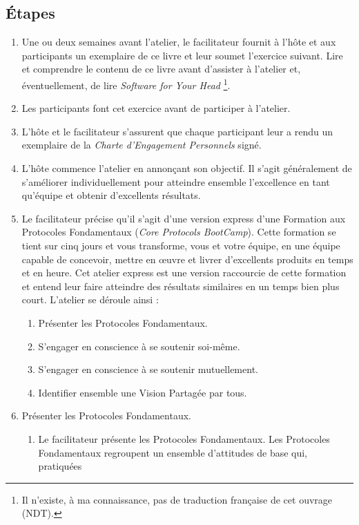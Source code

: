 \documentclass[paper=6in:9in,pagesize=pdftex,headinclude=on,footinclude=on,11pt]{scrbook}
\begin{document}
\subsection{Étapes}
\begin{enumerate}
	\item Une ou deux semaines avant l'atelier, le facilitateur fournit à l'hôte et aux participants un exemplaire de ce livre et leur soumet l'exercice suivant.
	      Lire et comprendre le contenu de ce livre avant d'assister à l'atelier et, éventuellement, de lire \emph{Software for Your Head}
	      \footnote{Il n'existe, à ma connaissance, pas de traduction française de cet ouvrage (NDT).}.
	\item Les participants font cet exercice avant de participer à l'atelier.
	\item L'hôte et le facilitateur s'assurent que chaque participant leur a rendu un exemplaire de la \emph{Charte d'Engagement Personnels} signé.
	\item L'hôte commence l'atelier en annonçant son objectif. Il s'agit généralement de s'améliorer individuellement pour atteindre ensemble l'excellence en tant
	      qu'équipe et obtenir d'excellents résultats.
	\item Le facilitateur précise qu'il s'agit d'une version \og{}express\fg{} d'une Formation aux Protocoles Fondamentaux (\emph{Core Protocols BootCamp}). Cette
	      formation se tient sur cinq jours et vous transforme, vous et votre équipe, en une équipe capable de concevoir, mettre en œuvre et livrer d'excellents
	      produits en temps et en heure. Cet atelier express est une version raccourcie de cette formation et entend leur faire atteindre des résultats similaires
	      en un temps bien plus court. L'atelier se déroule ainsi :
	      \begin{enumerate}
	      	\item Présenter les Protocoles Fondamentaux.
	      	\item S'engager en conscience à se soutenir soi-même.
	      	\item S'engager en conscience à se soutenir mutuellement.
	      	\item Identifier ensemble une Vision Partagée par tous.
	      \end{enumerate}
	\item Présenter les Protocoles Fondamentaux.
	      \begin{enumerate}
	      	\item Le facilitateur présente les Protocoles Fondamentaux. Les Protocoles Fondamentaux regroupent un ensemble d'attitudes de base qui, pratiquées

\end{enumerate}
\end{enumerate}
\end{document}
